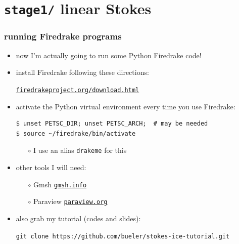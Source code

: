 \documentclass[10pt,hyperref,dvipsnames]{beamer}
\begin{document}
\section{\texttt{stage1/} \qquad linear Stokes}

\begin{frame}[fragile]
\frametitle{running Firedrake programs}

\begin{itemize}
\item now I'm actually going to run some Python Firedrake code!
\item install Firedrake following these directions:

\begin{center}
\href{https://www.firedrakeproject.org/download.html}{\texttt{firedrakeproject.org/download.html}}
\end{center}
\item activate the Python virtual environment every time you use Firedrake:

\bigskip
\begin{Verbatim}
$ unset PETSC_DIR; unset PETSC_ARCH;  # may be needed
$ source ~/firedrake/bin/activate
\end{Verbatim}

\bigskip
    \begin{itemize}
    \item[$\circ$] I use an alias \texttt{drakeme} for this
    \end{itemize}

\bigskip
\item other tools I will need:
    \begin{itemize}
    \item[$\circ$] Gmsh \quad \href{https://gmsh.info/}{\texttt{gmsh.info}}
    \item[$\circ$] Paraview \quad \href{https://www.paraview.org/}{\texttt{paraview.org}}
    \end{itemize}

\bigskip
\item also grab my tutorial (codes and slides):
\small
\begin{center}
\texttt{git clone https://github.com/bueler/stokes-ice-tutorial.git}
\end{center}

\end{itemize}
\end{frame}
\end{document}
